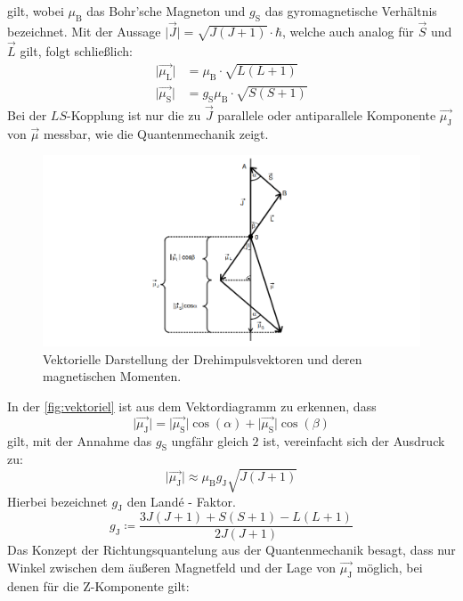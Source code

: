 gilt, wobei $\mu_{\text{B}}$ das Bohr'sche Magneton und $g_{\text{S}}$ das gyromagnetische Verhältnis bezeichnet.
Mit der Aussage $\lvert \vec{J} \rvert = \sqrt{J(J+1)} \cdot \hbar $, welche auch analog für $\vec{S}$ und $\vec{L}$ gilt, folgt schließlich:
\begin{align}
    \lvert \vec{\mu_{\text{L}}} \rvert &= \mu_{\text{B}} \cdot \sqrt{L(L+1)} \\
    \lvert \vec{\mu_{\text{S}}} \rvert &= g_{\text{S}} \mu_{\text{B}} \cdot \sqrt{S(S+1)}
\end{align}
Bei der $LS$-Kopplung ist nur die zu $\vec{J}$ parallele oder antiparallele Komponente $\vec{\mu_{\text{J}}}$ von $\vec{\mu}$ messbar, wie die Quantenmechanik zeigt.
\begin{figure}
    \centering
    \includegraphics[width=\textwidth]{vektorielle Darstellung.png}
    \caption{Vektorielle Darstellung der Drehimpulsvektoren und deren magnetischen Momenten. \cite{anleitung}}
    \label{fig:vektoriel}
\end{figure} 
In der \autoref{fig:vektoriel} ist aus dem Vektordiagramm zu erkennen, dass
\begin{equation}
    \lvert \vec{\mu_{\text{J}}} \rvert = \lvert \vec{\mu_{\text{S}}} \rvert \cos(\alpha) + \lvert \vec{\mu_{\text{S}}} \rvert \cos(\beta)
\end{equation}
gilt, mit der Annahme das $g_{\text{S}}$ ungfähr gleich $\num{2}$ ist, vereinfacht sich der Ausdruck zu:
\begin{equation}
    \lvert \vec{\mu_{\text{J}}} \rvert \approx \mu_{\text{B}} g_{\text{J}} \sqrt{J(J+1)} 
\end{equation}
Hierbei bezeichnet $g_{\text{J}}$ den Land\'{e} - Faktor. 
\begin{equation*}
    g_{\text{J}} \coloneq \frac{3J(J+1) + S(S+1)-L(L+1)}{2J(J+1)}
\end{equation*}
Das Konzept der Richtungsquantelung aus der Quantenmechanik besagt, dass nur Winkel zwischen dem äußeren Magnetfeld und der Lage von $\vec{\mu_{\text{J}}}$ möglich, bei denen für die Z-Komponente gilt:
